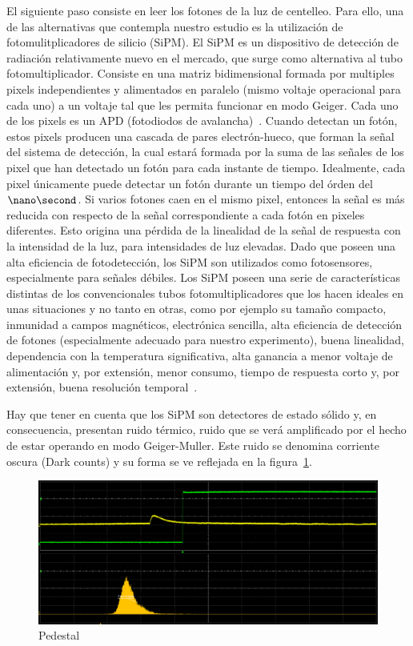 El siguiente paso consiste en leer los fotones de la luz de centelleo. Para ello, una de las alternativas que contempla nuestro estudio es la utilización de fotomulitplicadores de silicio (SiPM). El SiPM es un dispositivo de detección de radiación relativamente nuevo en el mercado, que surge como alternativa al tubo fotomultiplicador. Consiste en una matriz bidimensional formada por multiples pixels independientes y alimentados en paralelo (mismo voltaje operacional para cada uno) a un voltaje tal que les permita funcionar en modo Geiger. Cada uno de los pixels es un APD (fotodiodos de avalancha)~\cite{datasheet SiPM}.
Cuando detectan un fotón, estos pixels producen una cascada de pares electrón-hueco, que forman la señal del sistema de detección, la cual estará formada por la suma de las señales de los pixel que han detectado un fotón para cada instante de tiempo. Idealmente, cada pixel únicamente puede detectar un fotón durante un tiempo del órden del $\nano\second$. Si varios fotones caen en el mismo pixel, entonces la señal es más reducida  con respecto de la señal correspondiente a cada fotón en pixeles diferentes.  Esto origina una pérdida de la linealidad de la señal de respuesta con la intensidad de la luz, para intensidades de luz elevadas. Dado que  poseen una alta eficiencia de fotodetección, los SiPM son utilizados como fotosensores, especialmente para señales débiles.
 Los SiPM  poseen una serie de características distintas de los convencionales tubos fotomultiplicadores que los hacen ideales en unas situaciones y no tanto en otras, como por ejemplo su tamaño compacto, inmunidad a campos magnéticos, electrónica sencilla, alta eficiencia de detección de fotones (especialmente adecuado para nuestro experimento), buena linealidad, dependencia con la temperatura significativa, alta ganancia a menor voltaje de alimentación y, por extensión, menor consumo, tiempo de respuesta corto y, por extensión, buena resolución temporal~\cite{AMFNP}.

Hay que tener en cuenta que los SiPM son detectores de estado sólido y, en consecuencia, presentan ruido térmico, ruido que se verá amplificado por el hecho de estar operando en modo Geiger-Muller. Este ruido se denomina corriente oscura (Dark counts) y su forma se ve reflejada en la  figura~\ref{Darkcounts}.

\begin{figure}[hbtp]
\centering
\includegraphics[scale=0.3]{pedestal.png}
\caption{Pedestal \label{Darkcounts}}
\end{figure}

